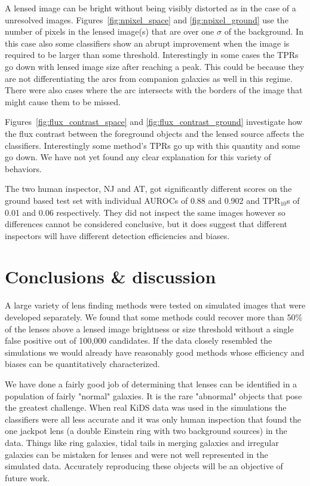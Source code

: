 \documentclass{aa}
\newcommand{\red}[1]{{\color{red} #1}}
\begin{document}
A lensed image can be bright without being visibly distorted as in the case of a unresolved images.  Figures~\ref{fig:npixel_space} and \ref{fig:npixel_ground} use the number of pixels in the lensed image(s) that are over  one $\sigma$ of the background.  In this case also some classifiers show an abrupt improvement when the image is required to be larger than some threshold.  Interestingly in some cases the TPRs go down with lensed image size after reaching a peak.  This could be because they are not differentiating the arcs from companion galaxies as well in this regime.  There were also cases where the arc intersects with the borders of the image that might cause them to be missed.

Figures~\ref{fig:flux_contrast_space} and \ref{fig:flux_contrast_ground} investigate how the flux contrast between the foreground objects and the lensed source affects the classifiers.  Interestingly some method's TPRs go up with this quantity and some go down.  We have not yet found any clear explanation for this variety of behaviors.  

The two human inspector, NJ and AT, got significantly different scores on the ground based test set with individual AUROCs of 0.88 and 0.902 and TPR$_{10}$s of 0.01 and 0.06 respectively.  They did not inspect the same images however so differences cannot be considered conclusive, but it does suggest that different inspectors will have different detection efficiencies and biases.


\section{Conclusions \& discussion}
\label{sec:conclusion}

A large variety of lens finding methods were tested on simulated images that were developed separately.    We found that some methods could recover more than 50\% of the lenses above a lensed image brightness or size threshold without a single false positive out of 100,000 candidates.  If the data closely resembled the simulations we would already have reasonably good methods whose efficiency and biases can be quantitatively characterized.

We have done a fairly good job of determining that lenses can be identified in a population of fairly "normal" galaxies.  It is the rare "abnormal" objects that pose the greatest challenge.  When real KiDS data was used in the simulations the classifiers were all less accurate and it was only human inspection that found the one jackpot lens (a double Einstein ring with two background sources) in the data.  Things like ring galaxies, tidal tails in merging galaxies and irregular galaxies can be mistaken for lenses and were not well represented in the simulated data.  Accurately reproducing these objects will be an objective of future work.
\end{document}
